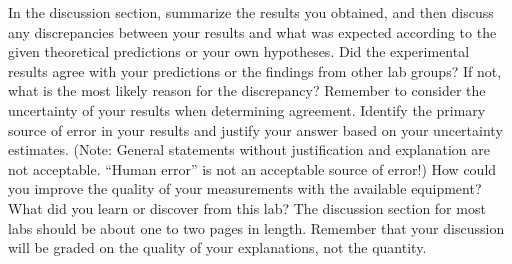 \documentclass[12pt, letterpaper]{article}
\begin{document}
In the discussion section, summarize the results you obtained, and then discuss any discrepancies between your 
results and what was expected according to the given theoretical predictions or your own hypotheses. Did the 
experimental results agree with your predictions or the findings from other lab groups? If not, what is the most likely 
reason for the discrepancy? Remember to consider the uncertainty of your results when determining agreement. 
Identify the primary source of error in your results and justify your answer based on your uncertainty estimates. 
(Note: General statements without justification and explanation are not acceptable. “Human error” is not an 
acceptable source of error!) How could you improve the quality of your measurements with the available equipment? 
What did you learn or discover from this lab? The discussion section for most labs should be about one to two 
pages in length. Remember that your discussion will be graded on the quality of your explanations, not the quantity. 
\end{document}
